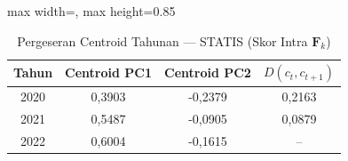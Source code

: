 \begin{table}[H]
\centering
\caption{Pergeseran Centroid Tahunan --- STATIS (Skor Intra $\mathbf{F}_k$)} \label{tab:sample1centroid_statis}
\begin{adjustbox}{max width=\textwidth, max height=0.85\textheight}
\begin{tabular}{|c|c|c|c|}
\hline
\textbf{Tahun} & \textbf{Centroid PC1} & \textbf{Centroid PC2} & \textbf{$D(c_t, c_{t+1})$} \\
\hline
2020 & 0,3903 & -0,2379 & 0,2163 \\
2021 & 0,5487 & -0,0905 & 0,0879 \\
2022 & 0,6004 & -0,1615 & -- \\
\hline
\end{tabular}
\end{adjustbox}
\end{table}